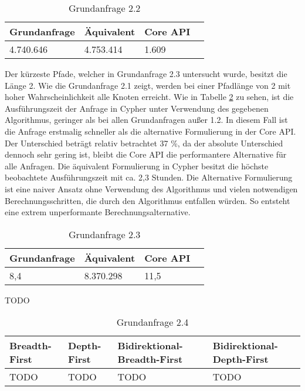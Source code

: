 \FloatBarrier
\begin{table}[h]
	\centering
		\begin{tabular}{ |p{3cm}|p{3cm}|p{3cm}|p{3cm}|  }
			\hline
			Grundanfrage & Äquivalent&Core API\\
			\hline
			4.740.646    & 4.753.414 &  1.609\\
			\hline
		\end{tabular}
		\caption{Grundanfrage 2.2}
		\label{tab:Query2_2}
\end{table}
\FloatBarrier
Der kürzeste Pfade, welcher in Grundanfrage 2.3 untersucht wurde, besitzt die Länge 2. Wie die Grundanfrage 2.1 zeigt, werden bei einer Pfadlänge von 2 mit hoher Wahrscheinlichkeit alle Knoten erreicht. Wie in Tabelle \ref{tab:Query2_3} zu sehen, ist die Ausführungszeit der Anfrage in Cypher unter Verwendung des gegebenen Algorithmus, geringer als bei allen Grundanfragen außer 1.2. In diesem Fall ist die Anfrage erstmalig schneller als die alternative Formulierung in der Core API. Der Unterschied beträgt relativ betrachtet 37 \%, da der absolute Unterschied dennoch sehr gering ist, bleibt die Core API die performantere Alternative für alle Anfragen. \newline
Die äquivalent Formulierung in Cypher besitzt die höchste beobachtete Ausführungszeit mit ca. 2,3 Stunden. Die Alternative Formulierung ist eine naiver Ansatz ohne Verwendung des Algorithmus und vielen notwendigen Berechnungsschritten, die durch den Algorithmus entfallen würden. So entsteht eine extrem unperformante Berechnungsalternative.  
\FloatBarrier
\begin{table}[!htb]
	\centering
		\begin{tabular}{ |p{3cm}|p{3cm}|p{3cm}|p{3cm}|  }
			\hline
			Grundanfrage & Äquivalent&Core API\\
			\hline
			8,4    & 8.370.298 &  11,5\\
			\hline
		\end{tabular}
		\caption{Grundanfrage 2.3}
		\label{tab:Query2_3}
\end{table}
\FloatBarrier
TODO
\FloatBarrier
\begin{table}[!htb]
	\centering
	\begin{tabular}{ |p{3cm}|p{3cm}|p{3cm}|p{3cm}|  }
		\hline
		Breadth-First & Depth-First&Bidirektional-Breadth-First &Bidirektional-Depth-First\\
		\hline
		TODO    & TODO &  TODO  &  TODO\\
		\hline
	\end{tabular}
	\caption{Grundanfrage 2.4}
\end{table}
